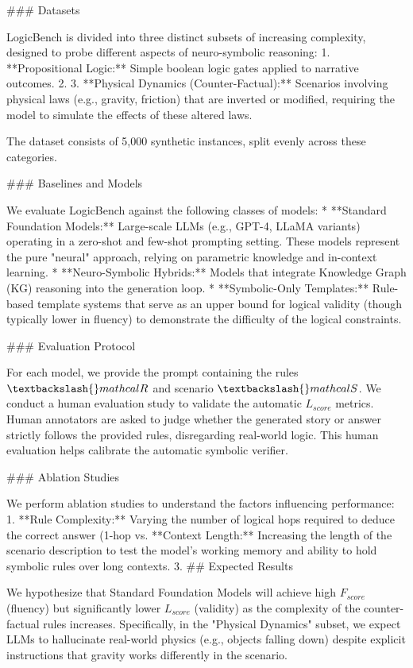 \documentclass{article}
\begin{document}
\#\#\# Datasets

LogicBench is divided into three distinct subsets of increasing complexity, designed to probe different aspects of neuro-symbolic reasoning:
1.  **Propositional Logic:** Simple boolean logic gates applied to narrative outcomes.
2. 
3.  **Physical Dynamics (Counter-Factual):** Scenarios involving physical laws (e.g., gravity, friction) that are inverted or modified, requiring the model to simulate the effects of these altered laws.

The dataset consists of 5,000 synthetic instances, split evenly across these categories.

\#\#\# Baselines and Models

We evaluate LogicBench against the following classes of models:
* **Standard Foundation Models:** Large-scale LLMs (e.g., GPT-4, LLaMA variants) operating in a zero-shot and few-shot prompting setting. These models represent the pure "neural" approach, relying on parametric knowledge and in-context learning.
* **Neuro-Symbolic Hybrids:** Models that integrate Knowledge Graph (KG) reasoning into the generation loop. 
* **Symbolic-Only Templates:** Rule-based template systems that serve as an upper bound for logical validity (though typically lower in fluency) to demonstrate the difficulty of the logical constraints.

\#\#\# Evaluation Protocol

For each model, we provide the prompt containing the rules $\textbackslash{}mathcal{R}$ and scenario $\textbackslash{}mathcal{S}$. We conduct a human evaluation study to validate the automatic $L_{score}$ metrics. Human annotators are asked to judge whether the generated story or answer strictly follows the provided rules, disregarding real-world logic. This human evaluation helps calibrate the automatic symbolic verifier.

\#\#\# Ablation Studies

We perform ablation studies to understand the factors influencing performance:
1.  **Rule Complexity:** Varying the number of logical hops required to deduce the correct answer (1-hop vs. **Context Length:** Increasing the length of the scenario description to test the model's working memory and ability to hold symbolic rules over long contexts.
3. \#\# Expected Results

We hypothesize that Standard Foundation Models will achieve high $F_{score}$ (fluency) but significantly lower $L_{score}$ (validity) as the complexity of the counter-factual rules increases.  Specifically, in the "Physical Dynamics" subset, we expect LLMs to hallucinate real-world physics (e.g., objects falling down) despite explicit instructions that gravity works differently in the scenario.
\end{document}
